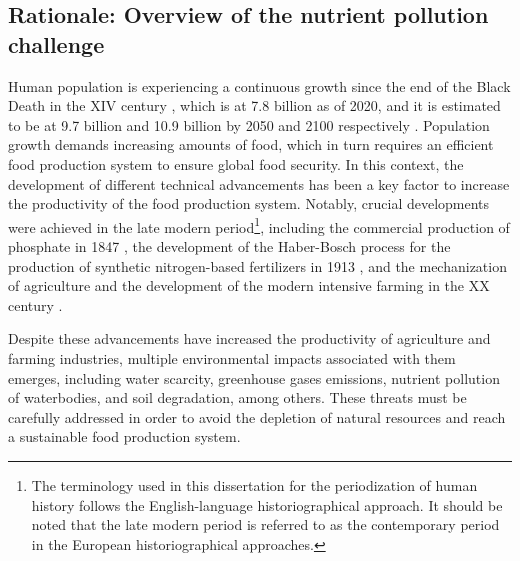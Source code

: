 \begin{refsection}[referencesCh1]

\section{Rationale: Overview of the nutrient pollution \newline challenge}
Human population is experiencing a continuous growth since the end of the Black Death in the XIV century \citep{biraben1980essay}, which is at 7.8 billion as of 2020, and it is estimated to be at 9.7 billion and 10.9 billion by 2050 and 2100 respectively \citep{UNPopulationProspects}. Population growth demands increasing amounts of food, which in turn requires an efficient food production system to ensure global food security.
In this context, the development of different technical advancements has been a key factor to increase the productivity of the food production system. Notably, crucial developments were achieved in the late modern period\footnote{The terminology used in this dissertation for the periodization of human history follows the English-language historiographical approach. It should be noted that the late modern period is referred to as the contemporary period in the European historiographical approaches.}, including the commercial production of phosphate in 1847 \citep{Samreen2019}, the development of the Haber-Bosch process for the production of synthetic nitrogen-based fertilizers in 1913 \citep{smil1999detonator}, and the mechanization of agriculture and the development of the modern intensive farming in the XX century \citep{constable2003century,nierenberg2005happier}.

Despite these advancements have increased the productivity of agriculture and farming industries, multiple environmental impacts associated with them emerges, including water scarcity, greenhouse gases emissions, nutrient pollution of waterbodies, and soil degradation, among others. These threats must be carefully addressed in order to avoid the depletion of natural resources and reach a sustainable food production system.


\end{refsection}
